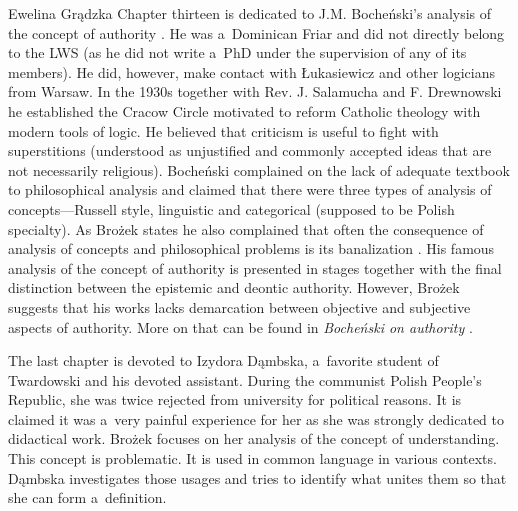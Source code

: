 \begin{newrevengenv}{Ewelina Grądzka}
Chapter thirteen is dedicated to J.M. Bocheński's analysis of the concept of authority
\parencite[cf.][]{bochenski_analysis_1974}. %
 He was a~Dominican Friar and did not directly belong to the LWS (as he did not write a~PhD under the supervision of any of its members). He did, however, make contact with Łukasiewicz and other logicians from Warsaw. In the 1930s together with Rev. J. Salamucha and F. Drewnowski he established the Cracow Circle motivated to reform Catholic theology with modern tools of logic. He believed that criticism is useful to fight with superstitions (understood as unjustified and commonly accepted ideas that are not necessarily religious). Bocheński complained on the lack of adequate textbook to philosophical analysis and claimed that there were three types of analysis of concepts---Russell style, linguistic and categorical (supposed to be Polish specialty). As Brożek states he also complained that often the consequence of analysis of concepts and philosophical problems is its banalization 
\parencite[][p.184]{brozek_anti-irrationalism_2020}. %
 His famous analysis of the concept of authority is presented in stages together with the final distinction between the epistemic and deontic authority. However, Brożek suggests that his works lacks demarcation between objective and subjective aspects of authority. More on that can be found in \textit{Bocheński on authority} 
\parencite[][]{brozek_bochenski_2013}.%


The last chapter is devoted to Izydora Dąmbska, a~favorite student of Twardowski and his devoted assistant. During the communist Polish People's Republic, she was twice rejected from university for political reasons. It is claimed it was a~very painful experience for her as she was strongly dedicated to didactical work. Brożek focuses on her analysis of the concept of understanding. This concept is problematic. It is used in common language in various contexts. Dąmbska investigates those usages and tries to identify what unites them so that she can form a~definition.


\end{newrevengenv}

